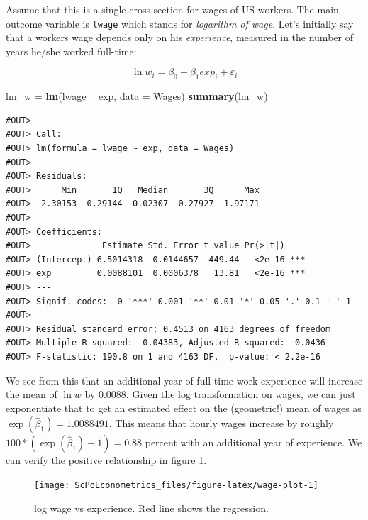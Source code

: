 \documentclass[]{book}
\newenvironment{Shaded}{\begin{snugshade}}{\end{snugshade}}
\newcommand{\KeywordTok}[1]{\textcolor[rgb]{0.13,0.29,0.53}{\textbf{#1}}}
\newcommand{\DataTypeTok}[1]{\textcolor[rgb]{0.13,0.29,0.53}{#1}}
\newcommand{\StringTok}[1]{\textcolor[rgb]{0.31,0.60,0.02}{#1}}
\newcommand{\OperatorTok}[1]{\textcolor[rgb]{0.81,0.36,0.00}{\textbf{#1}}}
\newcommand{\NormalTok}[1]{#1}
\theoremstyle{definition}
\theoremstyle{definition}
\theoremstyle{definition}
\theoremstyle{remark}
\begin{document}
Assume that this is a single cross section for wages of US workers. The
main outcome variable is \texttt{lwage} which stands for \emph{logarithm
of wage}. Let's initially say that a workers wage depends only on his
\emph{experience}, measured in the number of years he/she worked
full-time:

\[
\ln w_i = \beta_0 + \beta_1 exp_i + \varepsilon_i \label{eq:wage-exp}
\]

\begin{Shaded}
\begin{Highlighting}[]
\NormalTok{lm_w =}\StringTok{ }\KeywordTok{lm}\NormalTok{(lwage }\OperatorTok{~}\StringTok{ }\NormalTok{exp, }\DataTypeTok{data =}\NormalTok{ Wages)}
\KeywordTok{summary}\NormalTok{(lm_w)}
\end{Highlighting}
\end{Shaded}

\begin{verbatim}
#OUT> 
#OUT> Call:
#OUT> lm(formula = lwage ~ exp, data = Wages)
#OUT> 
#OUT> Residuals:
#OUT>      Min       1Q   Median       3Q      Max 
#OUT> -2.30153 -0.29144  0.02307  0.27927  1.97171 
#OUT> 
#OUT> Coefficients:
#OUT>              Estimate Std. Error t value Pr(>|t|)    
#OUT> (Intercept) 6.5014318  0.0144657  449.44   <2e-16 ***
#OUT> exp         0.0088101  0.0006378   13.81   <2e-16 ***
#OUT> ---
#OUT> Signif. codes:  0 '***' 0.001 '**' 0.01 '*' 0.05 '.' 0.1 ' ' 1
#OUT> 
#OUT> Residual standard error: 0.4513 on 4163 degrees of freedom
#OUT> Multiple R-squared:  0.04383, Adjusted R-squared:  0.0436 
#OUT> F-statistic: 190.8 on 1 and 4163 DF,  p-value: < 2.2e-16
\end{verbatim}

We see from this that an additional year of full-time work experience
will increase the mean of \(\ln w\) by 0.0088. Given the log
transformation on wages, we can just exponentiate that to get an
estimated effect on the (geometric!) mean of wages as
\(\exp(\hat{\beta}_1) = 1.0088491\). This means that hourly wages
increase by roughly \(100 * (\exp(\hat{\beta}_1)-1) = 0.88\) percent
with an additional year of experience. We can verify the positive
relationship in figure \ref{fig:wage-plot}.

\begin{figure}

{\centering \texttt{[image: ScPoEconometrics\_files/figure-latex/wage-plot-1]} 

}

\caption{log wage vs experience. Red line shows the regression.}\label{fig:wage-plot}
\end{figure}
\end{document}

